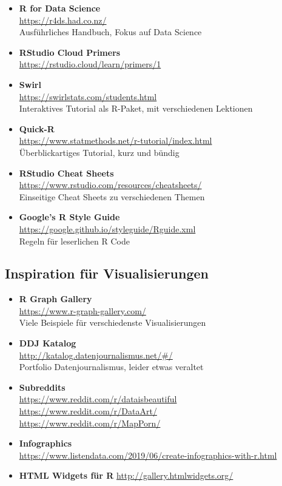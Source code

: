 \documentclass[
  ngerman,
]{article}
\begin{document}
\begin{itemize}
\item
  \textbf{R for Data Science}\\
  \url{https://r4ds.had.co.nz/}~\\
  Ausführliches Handbuch, Fokus auf Data Science
\item
  \textbf{RStudio Cloud Primers}\\
  \url{https://rstudio.cloud/learn/primers/1}
\item
  \textbf{Swirl}\\
  \url{https://swirlstats.com/students.html}~\\
  Interaktives Tutorial als R-Paket, mit verschiedenen Lektionen
\item
  \textbf{Quick-R}\\
  \url{https://www.statmethods.net/r-tutorial/index.html}~\\
  Überblickartiges Tutorial, kurz und bündig
\item
  \textbf{RStudio Cheat Sheets}\\
  \url{https://www.rstudio.com/resources/cheatsheets/}~\\
  Einseitige Cheat Sheets zu verschiedenen Themen
\item
  \textbf{Google's R Style Guide}\\
  \url{https://google.github.io/styleguide/Rguide.xml}~\\
  Regeln für leserlichen R Code
\end{itemize}

\hypertarget{inspiration-fuxfcr-visualisierungen}{%
\subsection*{Inspiration für Visualisierungen}\label{inspiration-fuxfcr-visualisierungen}}

\begin{itemize}
\item
  \textbf{R Graph Gallery}\\
  \url{https://www.r-graph-gallery.com/}~\\
  Viele Beispiele für verschiedenste Visualisierungen
\item
  \textbf{DDJ Katalog}\\
  \url{http://katalog.datenjournalismus.net/\#/}~\\
  Portfolio Datenjournalismus, leider etwas veraltet
\item
  \textbf{Subreddits}\\
  \url{https://www.reddit.com/r/dataisbeautiful}~\\
  \url{https://www.reddit.com/r/DataArt/}~\\
  \url{https://www.reddit.com/r/MapPorn/}
\item
  \textbf{Infographics}\\
  \url{https://www.listendata.com/2019/06/create-infographics-with-r.html}
\item
  \textbf{HTML Widgets für R}
  \url{http://gallery.htmlwidgets.org/}
\end{itemize}
\end{document}
